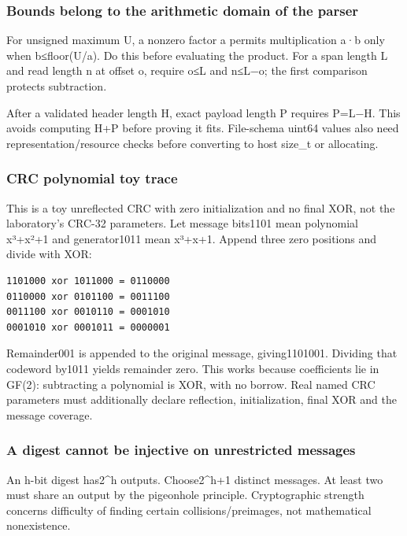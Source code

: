 \subsubsection{Bounds belong to the arithmetic domain of the parser}\label{bounds-belong-to-the-arithmetic-domain-of-the-parser}

For unsigned maximum U, a nonzero factor a permits multiplication a·b only when b≤floor(U/a). Do this before evaluating the product. For a span length L and read length n at offset o, require o≤L and n≤L−o; the first comparison protects subtraction.

After a validated header length H, exact payload length P requires P=L−H. This avoids computing H+P before proving it fits. File-schema uint64 values also need representation/resource checks before converting to host size\_t or allocating.

\subsubsection{CRC polynomial toy trace}\label{crc-polynomial-toy-trace}

This is a toy unreflected CRC with zero initialization and no final XOR, not the laboratory's CRC-32 parameters. Let message bits1101 mean polynomial x³+x²+1 and generator1011 mean x³+x+1. Append three zero positions and divide with XOR:

\begin{verbatim}
1101000 xor 1011000 = 0110000
0110000 xor 0101100 = 0011100
0011100 xor 0010110 = 0001010
0001010 xor 0001011 = 0000001
\end{verbatim}

Remainder001 is appended to the original message, giving1101001. Dividing that codeword by1011 yields remainder zero. This works because coefficients lie in GF(2): subtracting a polynomial is XOR, with no borrow. Real named CRC parameters must additionally declare reflection, initialization, final XOR and the message coverage.

\subsubsection{A digest cannot be injective on unrestricted messages}\label{a-digest-cannot-be-injective-on-unrestricted-messages}

An h-bit digest has2\^{}h outputs. Choose2\^{}h+1 distinct messages. At least two must share an output by the pigeonhole principle. Cryptographic strength concerns difficulty of finding certain collisions/preimages, not mathematical nonexistence.

